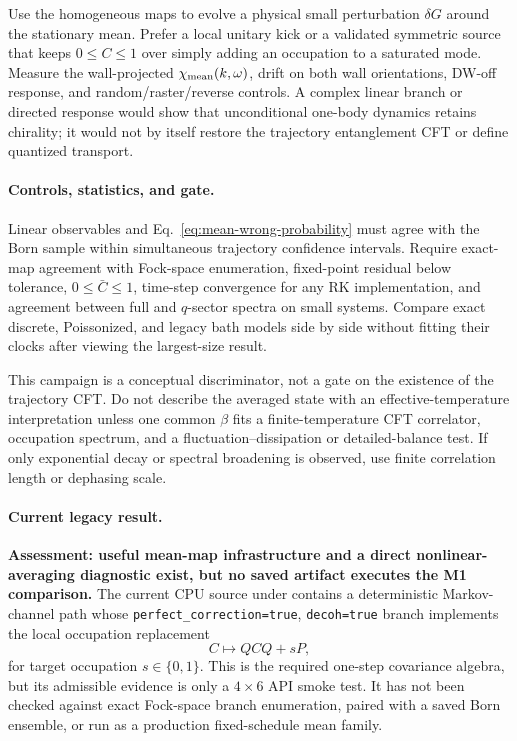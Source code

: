 \documentclass[aps,prx,twocolumn,floatfix,nofootinbib,superscriptaddress,longbibliography]{revtex4-2}
\newcommand{\code}[1]{\texttt{#1}}
\begin{document}
Use the homogeneous maps to evolve a physical small perturbation $\delta G$ around the
stationary mean.  Prefer a local unitary kick or a validated symmetric source that keeps
$0\le C\le1$ over simply adding an occupation to a saturated mode.  Measure the
wall-projected $\chi_{\rm mean}(k,\omega)$, drift on both wall orientations, DW-off
response, and random/raster/reverse controls.  A complex linear branch or directed response
would show that unconditional one-body dynamics retains chirality; it would not by itself
restore the trajectory entanglement CFT or define quantized transport.

\paragraph*{Controls, statistics, and gate.}
Linear observables and Eq.~\eqref{eq:mean-wrong-probability} must agree with the Born sample
within simultaneous trajectory confidence intervals.  Require exact-map agreement with
Fock-space enumeration, fixed-point residual below tolerance, $0\le\bar C\le1$, time-step
convergence for any RK implementation, and agreement between full and $q$-sector spectra
on small systems.  Compare exact discrete, Poissonized, and legacy bath models side by
side without fitting their clocks after viewing the largest-size result.

This campaign is a conceptual discriminator, not a gate on the existence of the
trajectory CFT.  Do not describe the averaged state with an effective-temperature
interpretation unless one common $\beta$ fits a finite-temperature CFT correlator,
occupation spectrum, and a fluctuation--dissipation or detailed-balance test.  If only
exponential decay or spectral broadening is observed, use finite correlation length or
dephasing scale.

\paragraph*{Current legacy result.}
\textbf{Assessment: useful mean-map infrastructure and a direct nonlinear-averaging
diagnostic exist, but no saved artifact executes the M1 comparison.}  The current CPU
source under  contains a deterministic Markov-channel path whose
\code{perfect\_correction=true}, \code{decoh=true} branch implements the local occupation
replacement
\begin{equation}
 C\longmapsto Q C Q+sP,
 \label{eq:M1-legacy-local-replacer}
\end{equation}
for target occupation $s\in\{0,1\}$.  This is the required one-step covariance algebra,
but its admissible evidence is only a $4\times6$ API smoke test.  It has not been checked
against exact Fock-space branch enumeration, paired with a saved Born ensemble, or run as
a production fixed-schedule mean family.
\end{document}
